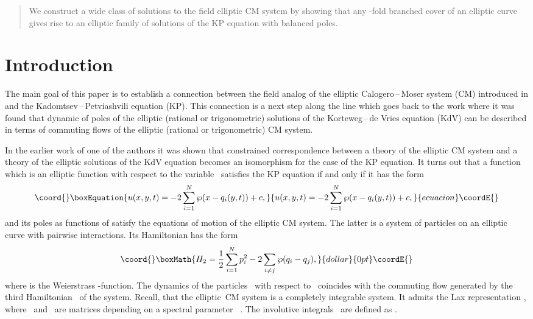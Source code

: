 \documentclass[a4paper,11pt]{article}
\DeclareMathOperator{\Tr}{Tr}
\theoremstyle{plain}
\theoremstyle{remark}
\begin{document}
\begin{titlepage}
\begin{abstract}
We construct a wide class of solutions to the field elliptic
CM system by showing that any \coordHE{}-fold branched cover of an
elliptic curve gives rise to an elliptic family of solutions
of the KP equation with balanced poles.
\end{abstract}

\vfill

\end{titlepage}

\section{Introduction}

The main goal of this paper is to establish a connection between
the field analog of the elliptic Calogero\,--\,Moser system (CM)
introduced in \cite{krvb} and the Kadomtsev\,--\,Petviashvili
equation (KP).
This connection is a next step along the line which goes back to the
work \cite{amkm} where it was found that dynamic of poles of the
elliptic (rational or trigonometric) solutions of the Korteweg\,--\,de
Vries equation (KdV) can be described in terms of commuting flows of
the elliptic (rational or trigonometric) CM system.

In the earlier work of one of the authors \cite{krelkp} it was shown that
constrained correspondence between a theory of the elliptic CM system
and a theory of the elliptic solutions of the KdV equation becomes an
isomorphism for the case of the KP equation. It turns out that a
function \coordHE{} which is an elliptic function with respect to the
variable~\coordHE{} satisfies the KP equation if and only if it has the form
\begin{equation}\coord{}\boxEquation{\label{pot}
u(x,y,t)=-2\sum_{i=1}^N\wp(x-q_i(y,t))+c,
}{u(x,y,t)=-2\sum_{i=1}^N\wp(x-q_i(y,t))+c,
}{ecuacion}\coordE{}\end{equation}
and its poles \coordHE{} as functions of \coordHE{} satisfy the equations of
motion of the elliptic CM system. The latter is a system of \coordHE{} particles
on an elliptic curve with pairwise interactions. Its Hamiltonian has the
form
$$\coord{}\boxMath{
H_2=\frac{1}{2}\sum_{i=1}^N p_i^2 - 2 \sum_{i\ne j}\wp(q_i-q_j),
}{dollar}{0pt}\coordE{}$$
where \coordHE{} is the Weierstrass \myHighlight{$\wp$}\coordHE{}-function. The dynamics of
the particles~\coordHE{} with respect to~\coordHE{} coincides with
the commuting flow generated by the third Hamiltonian~\coordHE{} of the system.
Recall, that the elliptic~CM system is a completely integrable system.
It admits the Lax representation \coordHE{}, where~\coordHE{} and~\coordHE{}
are \coordHE{} matrices depending on a spectral parameter~\coordHE{} \cite{c}.
The involutive integrals~\coordHE{} are defined as \myHighlight{$H_n=n^{-1}\Tr L^n$}\coordHE{}.
\end{document}
